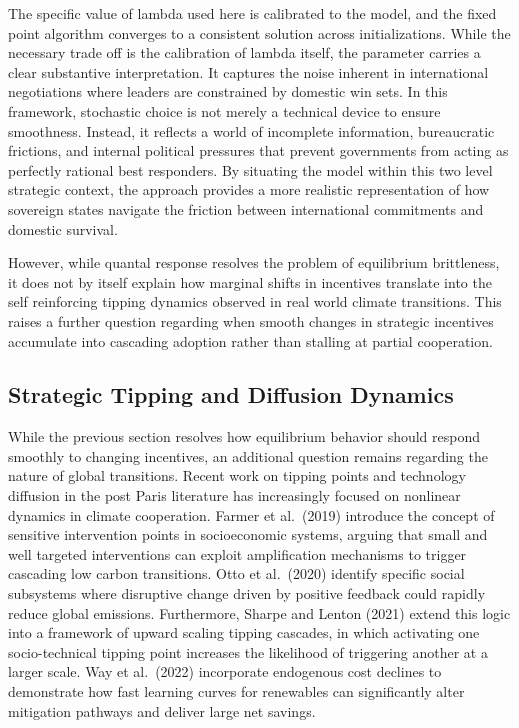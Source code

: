 \documentclass[12pt,a4paper]{article}
\begin{document}
The specific value of lambda used here is calibrated to the model, and the fixed point algorithm converges to a consistent solution across initializations. While the necessary trade off is the calibration of lambda itself, the parameter carries a clear substantive interpretation. It captures the noise inherent in international negotiations where leaders are constrained by domestic win sets. In this framework, stochastic choice is not merely a technical device to ensure smoothness. Instead, it reflects a world of incomplete information, bureaucratic frictions, and internal political pressures that prevent governments from acting as perfectly rational best responders. By situating the model within this two level strategic context, the approach provides a more realistic representation of how sovereign states navigate the friction between international commitments and domestic survival.

However, while quantal response resolves the problem of equilibrium brittleness, it does not by itself explain how marginal shifts in incentives translate into the self reinforcing tipping dynamics observed in real world climate transitions. This raises a further question regarding when smooth changes in strategic incentives accumulate into cascading adoption rather than stalling at partial cooperation.

\subsection{Strategic Tipping and Diffusion Dynamics}

While the previous section resolves how equilibrium behavior should respond smoothly to changing incentives, an additional question remains regarding the nature of global transitions. Recent work on tipping points and technology diffusion in the post Paris literature has increasingly focused on nonlinear dynamics in climate cooperation. Farmer et al.\ (2019) introduce the concept of sensitive intervention points in socioeconomic systems, arguing that small and well targeted interventions can exploit amplification mechanisms to trigger cascading low carbon transitions. Otto et al.\ (2020) identify specific social subsystems where disruptive change driven by positive feedback could rapidly reduce global emissions. Furthermore, Sharpe and Lenton (2021) extend this logic into a framework of upward scaling tipping cascades, in which activating one socio-technical tipping point increases the likelihood of triggering another at a larger scale. Way et al.\ (2022) incorporate endogenous cost declines to demonstrate how fast learning curves for renewables can significantly alter mitigation pathways and deliver large net savings.
\end{document}
